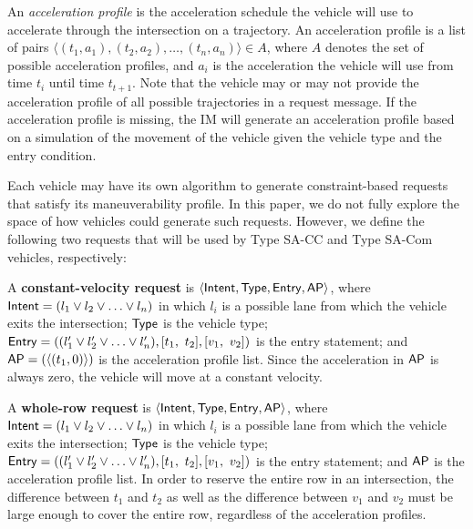 An \emph{acceleration profile} is the acceleration schedule the
vehicle will use to accelerate through the intersection on a
trajectory. An acceleration profile is a list of pairs $\langle (t_1,
a_1), (t_2, a_2), \ldots, (t_n, a_n) \rangle \in A$, where $A$ denotes
the set of possible acceleration profiles, and $a_i$ is the acceleration
the vehicle will use from time $t_i$ until time $t_{t+1}$.  Note that
the vehicle may or may not provide the acceleration profile of all
possible trajectories in a request message.  If the acceleration
profile is missing, the IM will generate an acceleration profile based
on a simulation of the movement of the vehicle given the vehicle type
and the entry condition.


Each vehicle may have its own algorithm to generate constraint-based
requests that satisfy its maneuverability profile.  In this paper, we
do not fully explore the space of how vehicles could generate such requests.
However, we define the following two requests that will be used by
Type SA-CC and Type SA-Com vehicles, respectively:

\begin{small_ind_s_itemize}
\item A \textbf{constant-velocity request}
is $\langle {\sf Intent}, {\sf Type}, {\sf Entry}, {\sf AP} \rangle$,
where
${\sf Intent} = ( l_1 \vee l_2 \vee \ldots \vee l_n )$
in which $l_i$ is a possible lane from which the vehicle 
exits the intersection;
${\sf Type}$ is the vehicle type;
${\sf Entry} = (( l'_1 \vee l'_2 \vee \ldots \vee l'_n ), [t_1,\ t_2], [v_1,\ v_2])$
is the entry statement; and
${\sf AP} = ( \langle (t_1, 0) \rangle )$
is the acceleration profile list.
Since the acceleration in ${\sf AP}$
is always zero, the vehicle will move at a constant velocity.

\item A \textbf{whole-row request}
is $\langle {\sf Intent}, {\sf Type}, {\sf Entry}, {\sf AP} \rangle$,
where
${\sf Intent} = ( l_1 \vee l_2 \vee \ldots \vee l_n )$
in which $l_i$ is a possible lane from which the vehicle 
exits the intersection;
${\sf Type}$ is the vehicle type;
${\sf Entry} = (( l'_1 \vee l'_2 \vee \ldots \vee l'_n ), [t_1,\ t_2], [v_1,\ v_2])$
is the entry statement; and
${\sf AP}$ is the acceleration profile list.
In order to reserve the entire row in an intersection,
the difference between $t_1$ and $t_2$ 
as well as the difference between $v_1$ and $v_2$
must be large enough to cover the entire row,
regardless of the acceleration profiles.
\end{small_ind_s_itemize}

